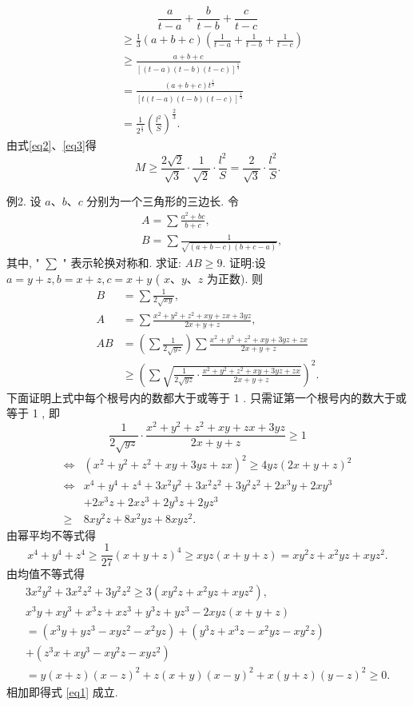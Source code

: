 $$
\frac{a}{t-a}+\frac{b}{t-b}+\frac{c}{t-c}
$$
$$
\begin{aligned}
& \geqslant \frac{1}{3}(a+b+c)\left(\frac{1}{t-a}+\frac{1}{t-b}+\frac{1}{t-c}\right) \\
& \geqslant \frac{a+b+c}{[(t-a)(t-b)(t-c)]^{\frac{1}{3}}} \\
& =\frac{(a+b+c) t^{\frac{1}{3}}}{[t(t-a)(t-b)(t-c)]^{\frac{1}{3}}} \\
& =\frac{1}{2^{\frac{1}{3}}}\left(\frac{l^2}{S}\right)^{\frac{2}{3}} .
\end{aligned} \label{eq3}
$$
由式\ref{eq2}、\ref{eq3}得
$$
M \geqslant \frac{2 \sqrt{2}}{\sqrt{3}} \cdot \frac{1}{\sqrt{2}} \cdot \frac{l^2}{S}=\frac{2}{\sqrt{3}} \cdot \frac{l^2}{S} .
$$



例2. 设 $a 、 b 、 c$ 分别为一个三角形的三边长.
令
$$
\begin{aligned}
& A=\sum \frac{a^2+b c}{b+c}, \\
& B=\sum \frac{1}{\sqrt{(a+b-c)(b+c-a)}},
\end{aligned}
$$
其中, " $\sum$ " 表示轮换对称和.
求证: $A B \geqslant 9$.
证明:设 $a=y+z, b=x+z, c=x+y$ ( $x 、 y 、 z$ 为正数). 则
$$
\begin{aligned}
B & =\sum \frac{1}{2 \sqrt{x y}}, \\
A & =\sum \frac{x^2+y^2+z^2+x y+z x+3 y z}{2 x+y+z}, \\
A B & =\left(\sum \frac{1}{2 \sqrt{y z}}\right) \sum \frac{x^2+y^2+z^2+x y+3 y z+z x}{2 x+y+z} \\
& \geqslant\left(\sum \sqrt{\frac{1}{2 \sqrt{y z}} \cdot \frac{x^2+y^2+z^2+x y+3 y z+z x}{2 x+y+z}}\right)^2 .
\end{aligned}
$$
下面证明上式中每个根号内的数都大于或等于 1 . 只需证第一个根号内的数大于或等于 1 , 即
$$
\frac{1}{2 \sqrt{y z}} \cdot \frac{x^2+y^2+z^2+x y+z x+3 y z}{2 x+y+z} \geqslant 1
$$
$$
\begin{aligned}
\Leftrightarrow & \left(x^2+y^2+z^2+x y+3 y z+z x\right)^2 \geqslant 4 y z(2 x+y+z)^2 \\
\Leftrightarrow & x^4+y^4+z^4+3 x^2 y^2+3 x^2 z^2+3 y^2 z^2+2 x^3 y+2 x y^3 \\
& +2 x^3 z+2 x z^3+2 y^3 z+2 y z^3 \\
\geqslant & 8 x y^2 z+8 x^2 y z+8 x y z^2 . \label{eq1}
\end{aligned}
$$
由幂平均不等式得
$$
x^4+y^4+z^4 \geqslant \frac{1}{27}(x+y+z)^4 \geqslant x y z(x+y+z)=x y^2 z+x^2 y z+x y z^2 .
$$
由均值不等式得
$$
\begin{gathered}
3 x^2 y^2+3 x^2 z^2+3 y^2 z^2 \geqslant 3\left(x y^2 z+x^2 y z+x y z^2\right), \\
x^3 y+x y^3+x^3 z+x z^3+y^3 z+y z^3-2 x y z(x+y+z) \\
=\left(x^3 y+y z^3-x y z^2-x^2 y z\right)+\left(y^3 z+x^3 z-x^2 y z-x y^2 z\right) \\
+\left(z^3 x+x y^3-x y^2 z-x y z^2\right) \\
=y(x+z)(x-z)^2+z(x+y)(x-y)^2+x(y+z)(y-z)^2 \geqslant 0 .
\end{gathered}
$$
相加即得式 \ref{eq1} 成立.



